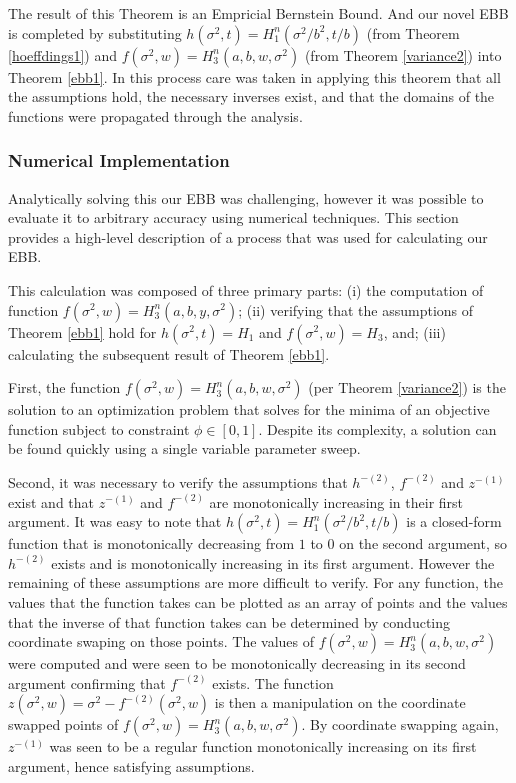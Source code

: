 The result of this Theorem is an Empricial Bernstein Bound. And our novel EBB is completed by substituting  $h(\sigma^2,t)=H_1^n\left(\sigma^2/b^2,t/b\right)$ (from Theorem \ref{hoeffdings1}) and $f(\sigma^2,w)=H_3^n\left(a,b,w,\sigma^2\right)$ (from Theorem \ref{variance2}) into Theorem \ref{ebb1}.
In this process care was taken in applying this theorem that all the assumptions hold, the necessary inverses exist, and that the domains of the functions were propagated through the analysis.




\subsubsection{Numerical Implementation}
\label{numerical-implementation}
Analytically solving this our EBB was challenging, however it was possible to evaluate it to arbitrary accuracy using numerical techniques.
This section provides a high-level description of a process that was used for calculating our EBB.

This calculation was composed of three primary parts:
(i) the computation of function $f(\sigma^2,w)=H_3^n(a,b,y,\sigma^2)$;
(ii) verifying that the assumptions of Theorem \ref{ebb1} hold for $h(\sigma^2,t)=H_1$ and $f(\sigma^2,w)=H_3$, and;
(iii) calculating the subsequent result of Theorem \ref{ebb1}.

First, the function $f(\sigma^2,w)=H_3^n(a,b,w,\sigma^2)$ (per Theorem \ref{variance2}) is the solution to an optimization problem that solves for the minima of an objective function subject to constraint $\phi\in[0,1]$.
Despite its complexity, a solution can be found quickly using a single variable parameter sweep.

Second, it was necessary to verify the assumptions that $h^{-(2)}$, $f^{-(2)}$ and $z^{-(1)}$ exist and that $z^{-(1)}$ and $f^{-(2)}$ are monotonically increasing in their first argument.
It was easy to note that $h(\sigma^2,t)=H_1^n\left(\sigma^2/b^2,t/b\right)$ is a closed-form function that is monotonically decreasing from $1$ to $0$ on the second argument, so $h^{-(2)}$ exists and is monotonically increasing in its first argument.  However the remaining of these assumptions are more difficult to verify.
For any function, the values that the function takes can be plotted as an array of points and the values that the inverse of that function takes can be determined by conducting coordinate swaping on those points.
The values of $f(\sigma^2,w)=H_3^n(a,b,w,\sigma^2)$ were computed and were seen to be monotonically decreasing in its second argument confirming that $f^{-(2)}$ exists.
The function $z(\sigma^2,w)=\sigma^2-f^{-(2)}\left(\sigma^2,w\right)$ is then a manipulation on the coordinate swapped points of $f(\sigma^2,w)=H_3^n(a,b,w,\sigma^2)$.
By coordinate swapping again, $z^{-(1)}$ was seen to be a regular function monotonically increasing on its first argument, hence satisfying assumptions.


